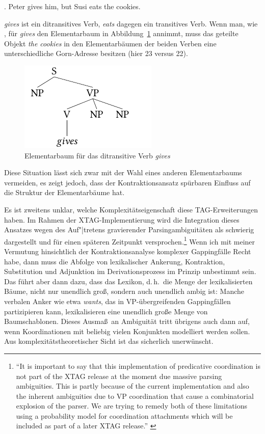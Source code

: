 \ex. \label{ex-contraction-4} Peter gives him, but Susi eats the cookies.

{\it gives} ist ein ditransitives Verb, {\it eats} dagegen ein transitives Verb. Wenn man, wie \citet[Figure~20]{Sarkar:Joshi:97}, für {\it gives} den Elementarbaum in Abbildung~\ref{fig-contraction-5} annimmt, muss das geteilte Objekt {\it the cookies} in den Elementarbäumen der beiden Verben eine unterschiedliche Gorn-Adresse besitzen (hier 23 versus 22).
\begin{figure}[t]
\centering
\includegraphics{graphics/abb810.pdf}
\caption{\label{fig-contraction-5}Elementarbaum für das ditransitive Verb {\it gives}}
\end{figure}
Diese Situation lässt sich zwar mit der Wahl eines anderen Elementarbaums vermeiden, es zeigt jedoch, dass der Kontraktionsansatz spürbaren Einfluss auf die Struktur der Elementarbäume hat. %

Es ist zweitens unklar, welche Komplexitätseigenschaft diese TAG-Erweiter\-ungen haben. Im Rahmen der XTAG-Implementierung \citep{xtag:01} wird die Integration dieses Ansatzes wegen des Auf"|tretens gravierender Parsingambiguitäten als schwierig dargestellt und für einen späteren Zeitpunkt versprochen.\footnote{"`It is important to say that this implementation of predicative coordination is not part of the XTAG release at the moment due massive parsing ambiguities. This is partly because of the current implementation and also the inherent ambiguities due to VP coordination that cause a combinatorial explosion of the parser. We are trying to remedy both of these limitations using a probability model for coordination attachments which will be included as part of a later XTAG release."' \citep[224]{xtag:01}} Wenn ich mit meiner Vermutung hinsichtlich der Kontraktionsanalyse komplexer Gappingfälle Recht habe, dann muss die Abfolge von lexikalischer Ankerung, Kontraktion, Substitution und Adjunktion im Derivationsprozess im Prinzip unbestimmt sein. Das führt aber dann dazu, dass das Lexikon, d.\,h.\ die Menge der lexikalisierten Bäume, nicht nur unendlich gro\ss, sondern auch unendlich ambig ist: Manche verbalen Anker wie etwa {\it wants}, das in VP-übergreifenden Gappingfällen partizipieren kann, lexikalisieren eine unendlich gro\ss e Menge von Baumschablonen. Dieses Ausma\ss\ an Ambiguität tritt übrigens auch dann auf, wenn Koordinationen mit beliebig vielen Konjunkten modelliert werden sollen. Aus komplexitätstheoretischer Sicht ist das sicherlich unerwünscht.    


